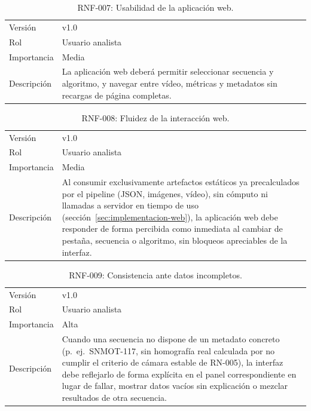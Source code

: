 \begin{table}[htp]
\centering
\caption{RNF-007: Usabilidad de la aplicación web.}
\label{tab:rnf-007}
\renewcommand{\arraystretch}{1.2}
\begin{tabular}{|p{3.1cm}|p{9.2cm}|}
\hline
\rowcolor{gray!25}
\multicolumn{2}{|l|}{\textbf{RNF-007 -- Usabilidad de la aplicación web}} \\
\hline
Versión & v1.0 \\
\hline
Rol & Usuario analista \\
\hline
Importancia & Media \\
\hline
Descripción & La aplicación web deberá permitir seleccionar secuencia y
  algoritmo, y navegar entre vídeo, métricas y metadatos sin recargas de
  página completas. \\
\hline
\end{tabular}
\end{table}

\begin{table}[htp]
\centering
\caption{RNF-008: Fluidez de la interacción web.}
\label{tab:rnf-008}
\renewcommand{\arraystretch}{1.2}
\begin{tabular}{|p{3.1cm}|p{9.2cm}|}
\hline
\rowcolor{gray!25}
\multicolumn{2}{|l|}{\textbf{RNF-008 -- Fluidez de la interacción web}} \\
\hline
Versión & v1.0 \\
\hline
Rol & Usuario analista \\
\hline
Importancia & Media \\
\hline
Descripción & Al consumir exclusivamente artefactos estáticos ya
  precalculados por el pipeline (JSON, imágenes, vídeo), sin cómputo ni
  llamadas a servidor en tiempo de uso (sección~\ref{sec:implementacion-web}),
  la aplicación web debe responder de forma percibida como inmediata al
  cambiar de pestaña, secuencia o algoritmo, sin bloqueos apreciables de la
  interfaz. \\
\hline
\end{tabular}
\end{table}

\begin{table}[htp]
\centering
\caption{RNF-009: Consistencia ante datos incompletos.}
\label{tab:rnf-009}
\renewcommand{\arraystretch}{1.2}
\begin{tabular}{|p{3.1cm}|p{9.2cm}|}
\hline
\rowcolor{gray!25}
\multicolumn{2}{|l|}{\textbf{RNF-009 -- Consistencia ante datos incompletos}} \\
\hline
Versión & v1.0 \\
\hline
Rol & Usuario analista \\
\hline
Importancia & Alta \\
\hline
Descripción & Cuando una secuencia no dispone de un metadato concreto
  (p.\ ej.\ SNMOT-117, sin homografía real calculada por no cumplir el
  criterio de cámara estable de RN-005), la interfaz debe reflejarlo de
  forma explícita en el panel correspondiente en lugar de fallar, mostrar
  datos vacíos sin explicación o mezclar resultados de otra secuencia. \\
\hline
\end{tabular}
\end{table}

